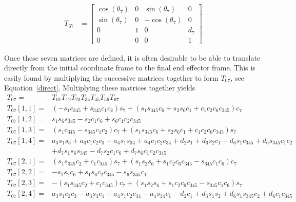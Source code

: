 \documentclass{article}
\begin{document}
\begin{align*}
T_{67} &=
\left[\begin{matrix}\cos{\left (\theta_{7} \right )} & 0 & \sin{\left (\theta_{7} \right )} & 0\\\sin{\left (\theta_{7} \right )} & 0 & - \cos{\left (\theta_{7} \right )} & 0\\0 & 1 & 0 & d_{7}\\0 & 0 & 0 & 1\end{matrix}\right]
\end{align*}

Once these seven matrices are defined, it is often desirable to be able to translate directly from the initial coordinate frame to the final end effector frame.
This is easily found by multiplying the successive matrices together to form $T_{07}$, see Equation~\ref{direct}.
Multiplying these matrices together yields
\begin{align}
T_{07} =& T_{01} T_{12} T_{23} T_{34} T_{45} T_{56} T_{67} \label{direct} \\
T_{07}[1, 1] =& \left(- s_{1} c_{345} + s_{345} c_{1} c_{2}\right) s_{7} + \left(s_{1} s_{345} c_{6} + s_{2} s_{6} c_{1} + c_{1} c_{2} c_{6} c_{345}\right) c_{7} \nonumber \\
T_{07}[1, 2] =& s_{1} s_{6} s_{345} - s_{2} c_{1} c_{6} + s_{6} c_{1} c_{2} c_{345} \nonumber \\
T_{07}[1, 3] =& \left(s_{1} c_{345} - s_{345} c_{1} c_{2}\right) c_{7} + \left(s_{1} s_{345} c_{6} + s_{2} s_{6} c_{1} + c_{1} c_{2} c_{6} c_{345}\right) s_{7} \nonumber \\
T_{07}[1, 4] =& a_{3} s_{1} s_{3} + a_{3} c_{1} c_{2} c_{3} + a_{4} s_{1} s_{34} + a_{4} c_{1} c_{2} c_{34} + d_{2} s_{1} + d_{3} s_{2} c_{1} - d_{6} s_{1} c_{345} + d_{6} s_{345} c_{1} c_{2} \nonumber \\
              & + d_{7} s_{1} s_{6} s_{345} - d_{7} s_{2} c_{1} c_{6} + d_{7} s_{6} c_{1} c_{2} c_{345} \nonumber \\
T_{07}[2, 1] =& \left(s_{1} s_{345} c_{2} + c_{1} c_{345}\right) s_{7} + \left(s_{1} s_{2} s_{6} + s_{1} c_{2} c_{6} c_{345} - s_{345} c_{1} c_{6}\right) c_{7} \nonumber \\
T_{07}[2, 2] =& - s_{1} s_{2} c_{6} + s_{1} s_{6} c_{2} c_{345} - s_{6} s_{345} c_{1} \nonumber \\
T_{07}[2, 3] =& - \left(s_{1} s_{345} c_{2} + c_{1} c_{345}\right) c_{7} + \left(s_{1} s_{2} s_{6} + s_{1} c_{2} c_{6} c_{345} - s_{345} c_{1} c_{6}\right) s_{7} \nonumber \\
T_{07}[2, 4] =& a_{3} s_{1} c_{2} c_{3} - a_{3} s_{3} c_{1} + a_{4} s_{1} c_{2} c_{34} - a_{4} s_{34} c_{1} - d_{2} c_{1} + d_{3} s_{1} s_{2} + d_{6} s_{1} s_{345} c_{2} + d_{6} c_{1} c_{345} \nonumber \\

\end{align}
\end{document}
